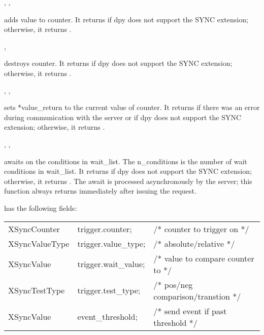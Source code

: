 ,
,
\cendfunctiondecl

 adds value to counter.
It returns  if dpy does not support the SYNC extension;
otherwise, it returns .
\cendfuncdescription


, 
\cendfunctiondecl

 destroys counter. 
It returns  if dpy does not
support the SYNC extension; otherwise, it returns .
\cendfuncdescription


,
,
\cendfunctiondecl

 sets *value\_return to the current value of
counter.  It returns  if there was an error during
communication with the server or if dpy does not support
the SYNC extension; otherwise, it returns .
\cendfuncdescription


,
,
\cendfunctiondecl

 awaits on the conditions in wait\_list.
The n\_conditions is the number of wait conditions in
wait\_list.  It returns  if dpy does not
support the SYNC extension; otherwise, it returns .
The await is processed asynchronously by the server;
this function always returns immediately
after issuing the request.

 has the following fields:

\begin{tabular}{lll}
XSyncCounter & trigger.counter; & /* counter to trigger on */ \\
XSyncValueType & trigger.value\_type; & /* absolute/relative */ \\
XSyncValue & trigger.wait\_value; & /* value to compare counter to */ \\
XSyncTestType & trigger.test\_type;	& /* pos/neg comparison/transtion */ \\
XSyncValue & event\_threshold; & /* send event if past threshold */ \\
\end{tabular}

